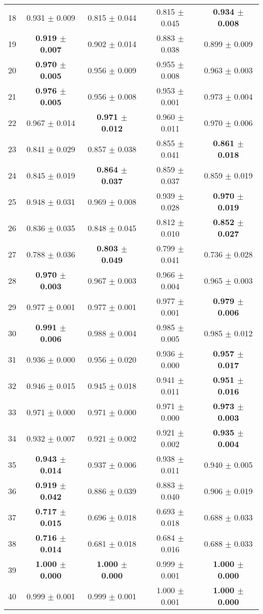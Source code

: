 \begin{table}[!ht]
{\begin{tabular}{r c c c c}
18 & 0.931 $\pm$ 0.009 & 0.815 $\pm$ 0.044 & 0.815 $\pm$ 0.045 & \textbf{0.934 $\pm$ 0.008} \\
19 & \textbf{0.919 $\pm$ 0.007} & 0.902 $\pm$ 0.014 & 0.883 $\pm$ 0.038 & 0.899 $\pm$ 0.009 \\
20 & \textbf{0.970 $\pm$ 0.005} & 0.956 $\pm$ 0.009 & 0.955 $\pm$ 0.008 & 0.963 $\pm$ 0.003 \\
21 & \textbf{0.976 $\pm$ 0.005} & 0.956 $\pm$ 0.008 & 0.953 $\pm$ 0.001 & 0.973 $\pm$ 0.004 \\
22 & 0.967 $\pm$ 0.014 & \textbf{0.971 $\pm$ 0.012} & 0.960 $\pm$ 0.011 & 0.970 $\pm$ 0.006 \\
23 & 0.841 $\pm$ 0.029 & 0.857 $\pm$ 0.038 & 0.855 $\pm$ 0.041 & \textbf{0.861 $\pm$ 0.018} \\
24 & 0.845 $\pm$ 0.019 & \textbf{0.864 $\pm$ 0.037} & 0.859 $\pm$ 0.037 & 0.859 $\pm$ 0.019 \\
25 & 0.948 $\pm$ 0.031 & 0.969 $\pm$ 0.008 & 0.939 $\pm$ 0.028 & \textbf{0.970 $\pm$ 0.019} \\
26 & 0.836 $\pm$ 0.035 & 0.848 $\pm$ 0.045 & 0.812 $\pm$ 0.010 & \textbf{0.852 $\pm$ 0.027} \\
27 & 0.788 $\pm$ 0.036 & \textbf{0.803 $\pm$ 0.049} & 0.799 $\pm$ 0.041 & 0.736 $\pm$ 0.028 \\
28 & \textbf{0.970 $\pm$ 0.003} & 0.967 $\pm$ 0.003 & 0.966 $\pm$ 0.004 & 0.965 $\pm$ 0.003 \\
29 & 0.977 $\pm$ 0.001 & 0.977 $\pm$ 0.001 & 0.977 $\pm$ 0.001 & \textbf{0.979 $\pm$ 0.006} \\
30 & \textbf{0.991 $\pm$ 0.006} & 0.988 $\pm$ 0.004 & 0.985 $\pm$ 0.005 & 0.985 $\pm$ 0.012 \\
31 & 0.936 $\pm$ 0.000 & 0.956 $\pm$ 0.020 & 0.936 $\pm$ 0.000 & \textbf{0.957 $\pm$ 0.017} \\
32 & 0.946 $\pm$ 0.015 & 0.945 $\pm$ 0.018 & 0.941 $\pm$ 0.011 & \textbf{0.951 $\pm$ 0.016} \\
33 & 0.971 $\pm$ 0.000 & 0.971 $\pm$ 0.000 & 0.971 $\pm$ 0.000 & \textbf{0.973 $\pm$ 0.003} \\
34 & 0.932 $\pm$ 0.007 & 0.921 $\pm$ 0.002 & 0.921 $\pm$ 0.002 & \textbf{0.935 $\pm$ 0.004} \\
35 & \textbf{0.943 $\pm$ 0.014} & 0.937 $\pm$ 0.006 & 0.938 $\pm$ 0.011 & 0.940 $\pm$ 0.005 \\
36 & \textbf{0.919 $\pm$ 0.042} & 0.886 $\pm$ 0.039 & 0.883 $\pm$ 0.040 & 0.906 $\pm$ 0.019 \\
37 & \textbf{0.717 $\pm$ 0.015} & 0.696 $\pm$ 0.018 & 0.693 $\pm$ 0.018 & 0.688 $\pm$ 0.033 \\
38 & \textbf{0.716 $\pm$ 0.014} & 0.681 $\pm$ 0.018 & 0.684 $\pm$ 0.016 & 0.688 $\pm$ 0.033 \\
39 & \textbf{1.000 $\pm$ 0.000} & \textbf{1.000 $\pm$ 0.000} & 0.999 $\pm$ 0.001 & \textbf{1.000 $\pm$ 0.000} \\
40 & 0.999 $\pm$ 0.001 & 0.999 $\pm$ 0.001 & 1.000 $\pm$ 0.001 & \textbf{1.000 $\pm$ 0.000} \\
\end{tabular}}
\end{table}
